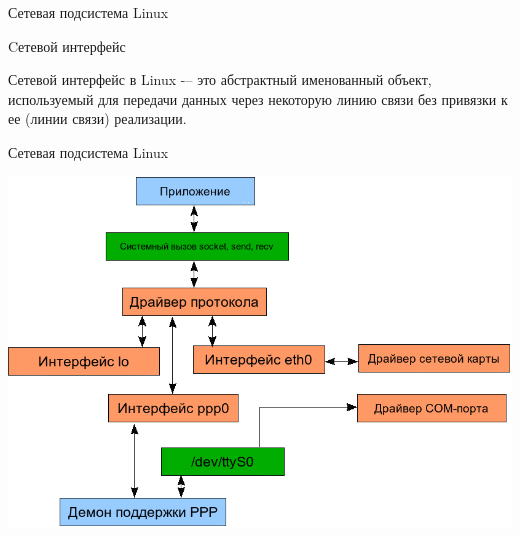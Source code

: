\begin{frame}{Сетевая подсистема Linux}

	\begin{block}{Cетевой интерфейс}

		Сетевой интерфейс в Linux -– это абстрактный именованный объект,  используемый для передачи 
		данных через некоторую линию связи без привязки к ее (линии связи) реализации.
	\end{block}
\end{frame}

\begin{frame}{Сетевая подсистема Linux}

	\center\includegraphics[height=0.8\textheight]{../../slides/networking/06-netstack.png}

\end{frame}


